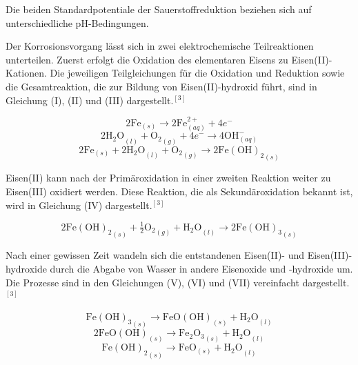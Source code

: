 \documentclass[12pt,a4paper]{article}
\begin{document}
Die beiden Standardpotentiale der Sauerstoffreduktion beziehen sich auf unterschiedliche pH-Bedingungen.

Der Korrosionsvorgang lässt sich in zwei elektrochemische Teilreaktionen unterteilen.
Zuerst erfolgt die Oxidation des elementaren Eisens zu Eisen(II)-Kationen.
Die jeweiligen Teilgleichungen für die Oxidation und Reduktion sowie die Gesamtreaktion,
die zur Bildung von Eisen(II)-hydroxid führt, sind in Gleichung (I), (II) und (III) dargestellt.$^{[3]}$

\begin{equation}
  2\mathrm{Fe}_{(s)} \rightarrow 2\mathrm{Fe}^{2+}_{(aq)}+4e^-
  \tag{I}
\end{equation}
\begin{equation}
  2\mathrm{H_2O}_{(l)}+\mathrm{O_2}_{(g)}+4e^-
  \rightarrow 4\mathrm{OH}^-_{(aq)}
  \tag{II}
\end{equation}
\begin{equation}
  2\mathrm{Fe}_{(s)}+2\mathrm{H_2O}_{(l)}+\mathrm{O_2}_{(g)}
  \rightarrow 2\mathrm{Fe(OH)_2}_{(s)}
  \tag{III}
\end{equation}

Eisen(II) kann nach der Primäroxidation in einer zweiten Reaktion weiter zu Eisen(III) oxidiert werden.
Diese Reaktion, die als Sekundäroxidation bekannt ist, wird in Gleichung (IV) dargestellt.$^{[3]}$

\begin{equation}
  2\mathrm{Fe(OH)_2}_{(s)}+\tfrac{1}{2}\mathrm{O_2}_{(g)}
  +\mathrm{H_2O}_{(l)}\rightarrow 2\mathrm{Fe(OH)_3}_{(s)}
  \tag{IV}
\end{equation}

Nach einer gewissen Zeit wandeln sich die entstandenen Eisen(II)- und Eisen(III)-hydroxide durch die Abgabe von Wasser in andere Eisenoxide und -hydroxide um.
Die Prozesse sind in den Gleichungen (V), (VI) und (VII) vereinfacht dargestellt.$^{[3]}$

\begin{equation}
  \mathrm{Fe(OH)_3}_{(s)}\rightarrow\mathrm{FeO(OH)}_{(s)}+\mathrm{H_2O}_{(l)}
  \tag{V}
\end{equation}
\begin{equation}
  2\mathrm{FeO(OH)}_{(s)}\rightarrow\mathrm{Fe_2O_3}_{(s)}+\mathrm{H_2O}_{(l)}
  \tag{VI}
\end{equation}
\begin{equation}
  \mathrm{Fe(OH)_2}_{(s)}\rightarrow\mathrm{FeO}_{(s)}+\mathrm{H_2O}_{(l)}
  \tag{VII}
\end{equation}
\end{document}
